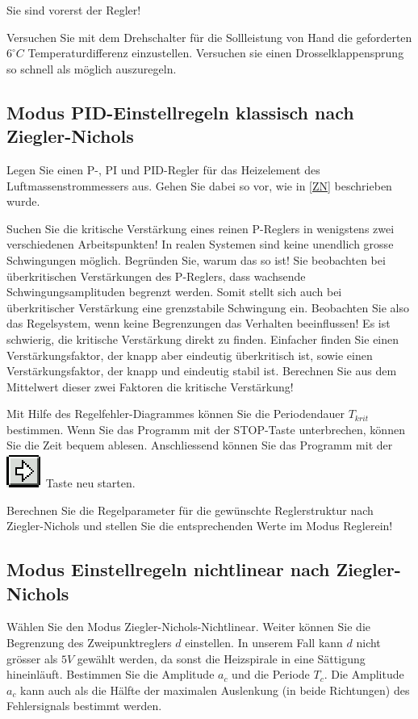 \documentclass[a4paper,10pt,oneside]{article}
\begin{document}
Sie sind vorerst der Regler!

Versuchen Sie mit dem Drehschalter für die Sollleistung von Hand die geforderten $6^\circ C$ Temperaturdifferenz einzustellen. Versuchen sie einen Drosselklappensprung so schnell als möglich auszuregeln. 

\newpage
\subsection{Modus \glqq PID-Einstellregeln klassisch nach Ziegler-Nichols\grqq}

Legen Sie einen P-, PI und PID-Regler für das Heizelement des Luftmassenstrommessers aus. Gehen Sie dabei so vor, wie in \ref{ZN} beschrieben wurde. 

Suchen Sie die kritische Verstärkung eines reinen P-Reglers in wenigstens zwei verschiedenen Arbeitspunkten!
In realen Systemen sind keine unendlich grosse Schwingungen möglich. Begründen Sie, warum das so ist!
Sie beobachten bei überkritischen Verstärkungen des P-Reglers, dass wachsende Schwingungsamplituden begrenzt werden. Somit stellt sich auch bei überkritischer Verstärkung eine grenzstabile Schwingung ein. Beobachten Sie also das Regelsystem, wenn keine Begrenzungen das Verhalten beeinflussen! Es ist schwierig, die kritische Verstärkung direkt zu finden. Einfacher finden Sie einen Verstärkungsfaktor, der knapp aber eindeutig überkritisch ist, sowie einen Verstärkungsfaktor, der knapp und eindeutig stabil ist. Berechnen Sie aus dem Mittelwert dieser zwei Faktoren die kritische Verstärkung!

Mit Hilfe des Regelfehler-Diagrammes können Sie die Periodendauer $T_{krit}$ bestimmen. Wenn Sie das Programm mit der STOP-Taste unterbrechen, können Sie die Zeit bequem ablesen. Anschliessend können Sie das Programm mit der \includegraphics{img/arrow.eps} Taste neu starten.

Berechnen Sie die Regelparameter für die gewünschte Reglerstruktur nach Ziegler-Nichols und stellen Sie die entsprechenden Werte im Modus \glqq Regler\grqq ein!

\subsection{Modus \glqq Einstellregeln nichtlinear nach Ziegler-Nichols\grqq}
Wählen Sie den Modus \grqq Ziegler-Nichols-Nichtlinear\grqq. Weiter können Sie die Begrenzung des Zweipunktreglers $d$ einstellen. In unserem Fall kann $d$ nicht grösser als $5V$ gewählt werden, da sonst die Heizspirale in eine Sättigung hineinläuft. Bestimmen Sie die Amplitude $a_c$ und die Periode $T_c$. Die Amplitude $a_c$ kann auch als die Hälfte der maximalen Auslenkung (in beide Richtungen) des Fehlersignals bestimmt werden.
\end{document}
